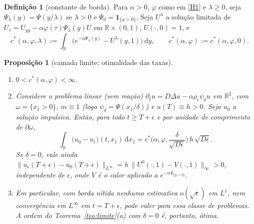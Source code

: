 \documentclass[11pt,a4paper]{article}
\numberwithin{equation}{section}
\newtheorem{proposicao}[teorema]{Proposição}
\theoremstyle{definition}
\newtheorem{definicao}[teorema]{Definição}
\theoremstyle{remark}
\newcommand{\R}{\mathbb{R}}
\newcommand{\dd}{\,\mathrm{d}}
\begin{document}
\begin{definicao}[constante de borda]
Para $\alpha>0$, $\varphi$ como em \ref{H1} e $\lambda\ge0$, seja $\Psi_\lambda(y)=\Psi(y/\lambda)$ se
$\lambda>0$ e $\Psi_0=\mathbf 1_{\{y>0\}}$. Seja $U^\lambda$ a solução limitada de
$U_\tau=U_{yy}-\alpha\varphi(\tau)\Psi_\lambda(y)U$ em $\R\times(0,1)$, $U(\cdot,0)=1$, e
\[
c^*(\alpha,\varphi,\lambda):=\int_\R\big(e^{-\alpha\Psi_\lambda(y)}-U^\lambda(y,1)\big)\dd y,
\qquad c^*(\alpha,\varphi):=c^*(\alpha,\varphi,0).
\]
\end{definicao}

\begin{proposicao}[camada limite; otimalidade das taxas]\label{prop:camada}
\begin{enumerate}
\item[(i)] $0<c^*(\alpha,\varphi)<\infty$.
\item[(ii)] Considere o problema linear (sem reação) $\partial_tu=D\Delta u-\alpha\rho_\epsilon\psi_\delta u$ em
$\R^2$, com $\omega=\{x_1>0\}$, $m\equiv1$ (logo $\psi_\delta=\Psi(x_1/\delta)$) e $u(T)\equiv h>0$. Seja
$u_0$ a solução impulsiva. Então, para todo $t\ge T+\epsilon$ e por unidade de comprimento de
$\partial\omega$,
\begin{equation}\label{eq:borda}
\int_\R\big(u_0-u_\epsilon\big)(t,x_1)\dd x_1=c^*\Big(\alpha,\varphi,\frac{\delta}{\sqrt{D\epsilon}}\Big)\,h\,\sqrt{D\epsilon}.
\end{equation}
Se $\delta=0$, vale ainda
$\|u_\epsilon(T+\epsilon)-u_0(T+\epsilon)\|_{L^\infty}=h\,\|U^0(\cdot,1)-V(\cdot,1)\|_\infty>0$, independente
de $\epsilon$, onde $V$ é o calor aplicado a $e^{-\alpha\mathbf 1_{\{y>0\}}}$.
\item[(iii)] Em particular, com borda nítida nenhuma estimativa $o(\sqrt\epsilon)$ em $L^1$, nem
convergência em $L^\infty$ em $t=T+\epsilon$, pode valer para essa classe de problemas. A ordem do
Teorema~\ref{teo:limite}(a) com $\delta=0$ é, portanto, ótima.
\end{enumerate}
\end{proposicao}
\end{document}
